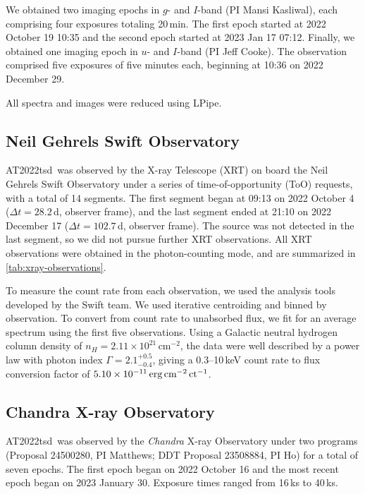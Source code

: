 \documentclass{nature_plusfigure}
\newcommand{\at}{AT2022tsd}
\begin{document}
\begin{methods}
We obtained two imaging epochs in $g$- and $I$-band (PI Mansi Kasliwal), each comprising four exposures totaling 20\,min. The first epoch started at 2022 October 19 10:35 and the second epoch started at 2023 Jan 17 07:12. 
Finally, we obtained one imaging epoch in $u$- and $I$-band (PI Jeff Cooke). The observation comprised five exposures of five minutes each, beginning at 10:36 on 2022 December 29.

All spectra and images were reduced using LPipe\cite{PerleyLPipe}.

\subsection{Neil Gehrels Swift Observatory}
\label{Methods:Swift}

\at\ was observed by the X-ray Telescope (XRT\cite{Burrows2005}) on board the Neil Gehrels Swift Observatory under a series of time-of-opportunity (ToO) requests, with a total of 14 segments. The first segment began at 09:13 on 2022 October 4 ($\Delta t=28.2\,$d, observer frame), and the last segment ended at 21:10 on 2022 December 17 ($\Delta t=102.7\,$d, observer frame). The source was not detected in the last segment, so we did not pursue further XRT observations.
All XRT observations were obtained in the photon-counting mode, and are summarized in \ref{tab:xray-observations}.

To measure the count rate from each observation, we used the analysis tools developed by the Swift team\cite{Evans2007,Evans2009}.
We used iterative centroiding and binned by observation. 
To convert from count rate to unabsorbed flux, we fit for an average spectrum using the first five observations. Using a Galactic neutral hydrogen column density\cite{Willingale2013} of $n_H=2.11\times10^{21}\,$cm$^{-2}$, the data were well described by a power law with photon index $\Gamma=2.1^{+0.5}_{-0.4}$, 
giving a 0.3--10\,keV count rate to flux conversion factor of $5.10\times 10^{-11}\,\rm erg\,cm^{-2}\,ct^{-1}$.

\subsection{Chandra X-ray Observatory}
\label{sec:chandra}

\at\ was observed by the \emph{Chandra} X-ray Observatory under two programs (Proposal 24500280, PI Matthews; DDT Proposal 23508884, PI Ho) for a total of seven epochs. The first epoch began on 2022 October 16 and the most recent epoch began on 2023 January 30. Exposure times ranged from 16\,ks to 40\,ks.


\end{methods}
\end{document}
